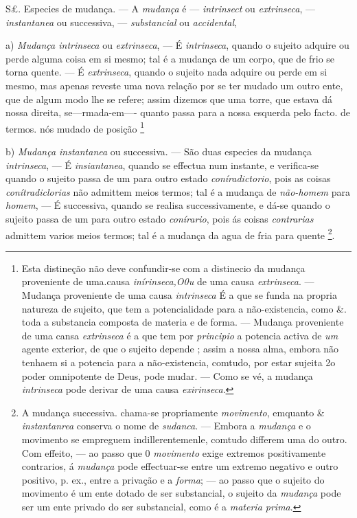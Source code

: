 S£. Especies de mudança. --- A \emph{mudança} é --- \emph{intrinsect} ou \emph{extrinseca}, --- \emph{instantanea} ou successiva, --- \emph{substancial} ou \emph{accidental},

a) \emph{Mudança intrinseca} ou \emph{extrinseca}, --- É \emph{intrinseca}, quando o sujeito adquire ou perde alguma coisa em si mesmo; tal é a mudança de um corpo, que de frio se torna quente. --- É \emph{extrinseca}, quando o sujeito nada adquire ou perde em si mesmo, mas apenas reveste uma nova relação por se ter mudado um outro ente, que de algum modo lhe se refere; assim dizemos que uma torre, que estava dá nossa direita, se---rmada-em---- quanto passa para a nossa esquerda pelo facto. de termos. nós mudado de posição \footnote{Esta distineção não deve confundir-se com a distinecio da mudança proveniente de uma.causa \emph{inírinseca,O0u} de uma causa \emph{extrinseca}. --- Mudança proveniente de uma causa \emph{intrinseca} É a que se funda na propria natureza de sujeito, que tem a potencialidade para a não-existencia, como \&. toda a substancia composta de materia e de forma. --- Mudança proveniente de uma cansa \emph{extrinseca} é a que tem por \emph{principio} a potencia activa de \emph{um} agente exterior, de que o sujeito depende ; assim a nossa alma, embora não tenhaem si a potencia para a não-existencia, comtudo, por estar sujeita 2o poder omnipotente de Deus, pode mudar. --- Como se vé, a mudança \emph{intrinseca} pode derivar de uma causa \emph{exirinseca}.}

 b) \emph{Mudança instantanea} ou successiva. --- São duas especies da mudança \emph{intrinseca}, --- É \emph{insiantanea}, quando se effectua num instante, e verifica-se quando o sujeito passa de um para outro estado \emph{coníradictorio}, pois as coisas \emph{conítradiclorias} não admittem meios termos; tal é a mudança de \emph{não-homem} para \emph{homem}, --- É successiva, quando se realisa successivamente, e dá-se quando o sujeito passa de um para outro estado \emph{conírario}, pois ás coisas \emph{contrarias} admittem varios meios termos; tal é a mudança da agua de fria para quente \footnote{A mudança successiva. chama-se propriamente \emph{movimento}, emquanto \& \emph{instantanrea} conserva o nome de \emph{sudanca}. --- Embora a \emph{mudança} e o movimento se empreguem indillerentemenle, comtudo differem uma do outro. Com effeito, --- ao passo que 0 \emph{movimento} exige extremos positivamente contrarios, á \emph{mudança} pode effectuar-se entre um extremo negativo e outro positivo, p. ex., entre a privação e a \emph{forma}; --- ao passo que o sujeito do movimento é um ente dotado de ser substancial, o sujeito da \emph{mudança} pode ser um ente privado do ser substancial, como é a \emph{materia prima}.}.

